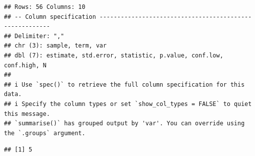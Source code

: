 \documentclass[
]{article}
\begin{document}
\begin{verbatim}
## Rows: 56 Columns: 10
## -- Column specification --------------------------------------------------------
## Delimiter: ","
## chr (3): sample, term, var
## dbl (7): estimate, std.error, statistic, p.value, conf.low, conf.high, N
## 
## i Use `spec()` to retrieve the full column specification for this data.
## i Specify the column types or set `show_col_types = FALSE` to quiet this message.
## `summarise()` has grouped output by 'var'. You can override using the `.groups` argument.
\end{verbatim}

\begin{verbatim}
## [1] 5
\end{verbatim}

\begin{table}
\centering
\caption{\label{tab:sob-reason-table}Second Order Beliefs: Reasons}
\centering
{}
\end{table}
\end{document}
